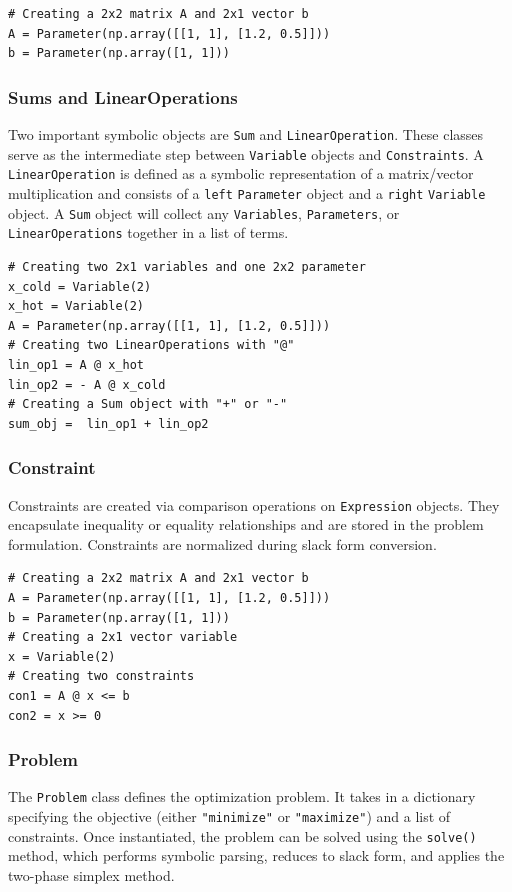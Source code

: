 \documentclass[conference]{IEEEtran}
\begin{document}
\begin{lstlisting}[style=mypython] 
# Creating a 2x2 matrix A and 2x1 vector b
A = Parameter(np.array([[1, 1], [1.2, 0.5]])) 
b = Parameter(np.array([1, 1])) 
\end{lstlisting}

\subsubsection{Sums and LinearOperations}
Two important symbolic objects are \texttt{Sum} and \texttt{LinearOperation}.
These classes serve as the intermediate step between \texttt{Variable} objects and \texttt{Constraints}.
A \texttt{LinearOperation} is defined as a symbolic representation of a matrix/vector multiplication and consists of a \texttt{left} \texttt{Parameter} object and a \texttt{right} \texttt{Variable} object.
A \texttt{Sum} object will collect any \texttt{Variables}, \texttt{Parameters}, or \texttt{LinearOperations} together in a list of terms.
\begin{lstlisting}[style=mypython]
# Creating two 2x1 variables and one 2x2 parameter 
x_cold = Variable(2)
x_hot = Variable(2)
A = Parameter(np.array([[1, 1], [1.2, 0.5]])) 
# Creating two LinearOperations with "@"
lin_op1 = A @ x_hot
lin_op2 = - A @ x_cold
# Creating a Sum object with "+" or "-"
sum_obj =  lin_op1 + lin_op2
\end{lstlisting}

\subsubsection{Constraint} Constraints are created via comparison operations on \texttt{Expression} objects. 
They encapsulate inequality or equality relationships and are stored in the problem formulation. 
Constraints are normalized during slack form conversion.

\begin{lstlisting}[style=mypython]
# Creating a 2x2 matrix A and 2x1 vector b
A = Parameter(np.array([[1, 1], [1.2, 0.5]])) 
b = Parameter(np.array([1, 1])) 
# Creating a 2x1 vector variable
x = Variable(2) 
# Creating two constraints
con1 = A @ x <= b 
con2 = x >= 0 
\end{lstlisting}



\subsubsection{Problem} The \texttt{Problem} class defines the optimization problem. 
It takes in a dictionary specifying the objective (either \texttt{"minimize"} or \texttt{"maximize"}) and a list of constraints. 
Once instantiated, the problem can be solved using the \texttt{solve()} method, which performs symbolic parsing, reduces to slack form, and applies the two-phase simplex method.
\end{document}
